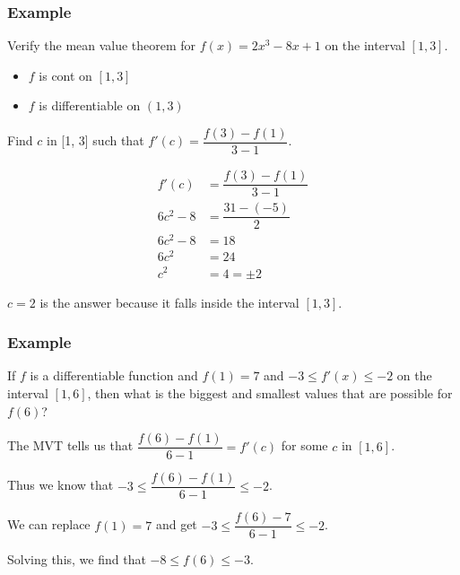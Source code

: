 \documentclass[t]{beamer}
\theoremstyle{plain}
\theoremstyle{definition}
\begin{document}
\begin{frame}

\frametitle{Example}

\footnotesize

Verify the mean value theorem for $f(x) = 2x^3 - 8x + 1$ on the interval $[1, 3]$. \pause

\begin{itemize}
	\item $f$ is cont on $[1, 3]$
	\item $f$ is differentiable on $(1, 3)$
\end{itemize}

Find $c$ in [1, 3] such that $f'(c) = \dfrac{f(3) - f(1)}{3-1}.$

\begin{align*}
	f'(c) &= \dfrac{f(3) - f(1)}{3-1}\\
	6c^2 - 8  &= \dfrac{31-(-5)}{2}\\
	6c^2 - 8 &= 18\\
	6c^2 &= 24\\
	c^2 &= 4 = \pm 2
\end{align*}

$c=2$ is the answer because it falls inside the interval $[1, 3]$.

\end{frame}

\begin{frame}

\frametitle{Example}

\footnotesize

If $f$ is a differentiable function and $f(1) = 7$ and $-3 \leq f'(x) \leq -2$ on the interval $[1, 6]$, then what is the biggest and smallest values that are possible for $f(6)$?
\pause
\vspace{1em}

The MVT tells us that $\dfrac{f(6) - f(1)}{6-1} = f'(c)$ for some $c$ in $[1, 6]$.

\vspace{1em}

Thus we know that $-3 \leq \dfrac{f(6) - f(1)}{6-1} \leq -2$.

\vspace{1em}

We can replace $f(1) = 7$ and get $-3 \leq \dfrac{f(6) - 7}{6-1} \leq -2$.

\vspace{1em}

Solving this, we find that $-8 \leq f(6) \leq -3$.  

\end{frame}
\end{document}
